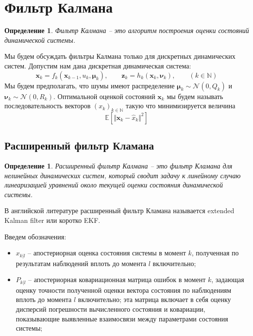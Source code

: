\documentclass[12pt]{article}
\newtheorem{definition}[theorem]{Определение}
\begin{document}
\section{Фильтр Калмана}
\label{SectionKalmanFilter}

\begin{definition} Фильтр Калмана -- это алгоритм построения оценки
    состояний динамической системы.
\end{definition}

Мы будем обсуждать фильтры Калмана только для дискретных динамических систем.
Допустим нам дана дискретная динамическая система:
\begin{equation}
    \pmb{x}_{k}=f_k(\pmb{x}_{k-1}, u_k, \pmb{\mu}_k), \qquad
    \pmb{z}_k=h_k(\pmb{x}_k, \pmb{\nu}_k), \qquad
    (k\in\mathbb{N})
\end{equation}
Мы будем предполагать, что шумы имеют распределение $\pmb{\mu}_k\sim \mathcal{N}(0, Q_k)$
и $\pmb{\nu}_k\sim\mathcal{N}(0, R_k)$. 
Оптимальной оценкой состояний $\pmb{x}_{k}$ мы будем называть последовательность 
векторов $(x_k)_{k\in\mathbb{N}}$ такую что минимизируется величина
\begin{equation}
    \mathbb{E}[\Vert \pmb{x}_{k}-\hat{x}_k\Vert^2]
\end{equation}

\subsection{Расширенный фильтр Кламана}
\label{SubsectionExtendedKalmanFilter}

\begin{definition} Расширенный фильтр Калмана -- это фильтр Кламана для
    нелинейных динамических систем, который сводит задачу к линейному
    случаю линеаризацией уравнений около текущей оценки состояния
    динамической системы.
\end{definition}

В английской литературе расширенный фильтр Кламана называется extended Kalman
filter или коротко EKF.

Введем обозначения:
\begin{itemize}
    \item[] $x_{k|l}$ -- апостериорная оценка состояния системы в момент $k$,
          полученная по результатам наблюдений вплоть до момента $l$ включительно;
    \item[] $P_{k|l}$ -- апостериорная ковариационная матрица ошибок в момент $k$,
          задающая  оценку точности полученной оценки вектора состояния по наблюдениям
          вплоть до момента $l$ включительно; эта матрица включает в себя
          оценку дисперсий погрешности вычисленного состояния и ковариации,
          показывающие выявленные взаимосвязи между параметрами состояния системы;
\end{itemize}
\end{document}
